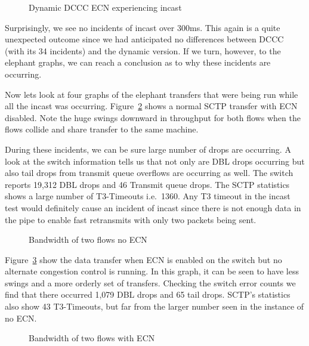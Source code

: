 \documentclass[12pt]{article}
\begin{document}
\begin{figure}[h]
\centering
{}
\caption{Dynamic DCCC ECN experiencing incast}
\label{fig:dynIncast}
\end{figure}


Surprisingly, we see no incidents of incast over 300ms. This again is a quite unexpected
outcome since we had anticipated no differences between DCCC (with its 34 incidents) and
the dynamic version. If we turn, however, to the elephant graphs, we can reach a conclusion
as to why these incidents are occurring.

\newpage

Now lets look at four graphs of the elephant transfers that were being run while all
the incast was occurring. Figure~\ref{fig:noEcnBw} shows a normal SCTP transfer with
ECN disabled. Note the huge swings downward in throughput for both
flows when the flows collide and share transfer to the same machine. 

During these incidents, we can be sure large number of drops are occurring. A look at the switch
information tells us that not only are DBL drops occurring but also tail
drops from transmit queue overflows are occurring as well.  The switch reports 19,312 DBL drops
and 46 Transmit queue drops. The SCTP statistics shows
a large number of T3-Timeouts i.e.~1360. Any T3 timeout in the incast test would definitely
cause an incident of incast since there is not enough data in the pipe to enable fast retransmits with
only two packets being sent.

\begin{figure}[h]
\centering
{}
\caption{Bandwidth of two flows no ECN}
\label{fig:noEcnBw}
\end{figure}


\newpage

Figure~\ref{fig:ecnBw} show the data transfer when ECN is enabled on
the switch but no alternate congestion control is running. In this graph,
it can be seen to have  less swings and a more orderly set of transfers. Checking
the switch error counts we find that there occurred 1,079 DBL drops and 65 tail
drops. SCTP's statistics also show 43 T3-Timeouts, but far from the larger
number seen in the instance of no ECN.

\begin{figure}[h]
\centering
{}
\caption{Bandwidth of two flows with ECN}
\label{fig:ecnBw}
\end{figure}
\end{document}
